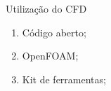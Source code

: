 \begin{frame}[t]{Utilização do CFD}
            \begin{enumerate}
                \item Código aberto;
                \item OpenFOAM;
                \item Kit de ferramentas;
        
            \end{enumerate}
    
\end{frame}
